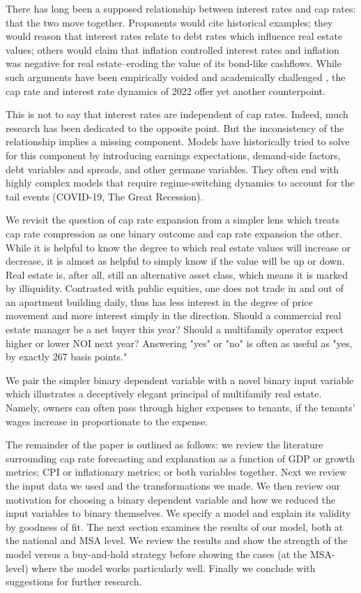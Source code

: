 There has long been a supposed relationship between interest rates and cap rates: that the two move together. Proponents would cite historical examples; they would reason that interest rates relate to debt rates which influence real estate values; others would claim that inflation controlled interest rates and inflation was negative for real estate--eroding the value of its bond-like cashflows. While  such arguments have been empirically voided and academically challenged \citep*{larriva2021determinants}, the cap rate and interest rate dynamics of 2022 offer yet another counterpoint. 

This is not to say that interest rates are independent of cap rates. Indeed, much research has been dedicated to the opposite point. But the inconsistency of the relationship implies a missing component. Models have historically tried to solve for this component by introducing earnings expectations, demand-side factors, debt variables and spreads, and other germane variables. They often end with highly complex models that require regime-switching dynamics to account for the tail events (COVID-19, The Great Recession).

We revisit the question of cap rate expansion from a simpler lens which treats cap rate compression as one binary outcome and cap rate expansion the other. While it is helpful to know the degree to which real estate values will increase or decrease, it is almost as helpful to simply know if the value will be up or down. Real estate is, after all, still an alternative asset class, which means it is marked by illiquidity. Contrasted with public equities, one does not trade in and out of an apartment building daily, thus has less interest in the degree of price movement and more interest simply in the direction. Should a commercial real estate manager be a net buyer this year? Should a multifamily operator expect higher or lower NOI next year? Answering "yes" or "no" is often as useful as "yes, by exactly 267 basis points."

We pair the simpler binary dependent variable with a novel binary input variable which illustrates a deceptively elegant principal of multifamily real estate. Namely, owners can often pass through higher expenses to tenants, if the tenants' wages increase in proportionate to the expense.

The remainder of the paper is outlined as follows: we review the literature surrounding cap rate forecasting and explanation as a function of GDP or growth metrics; CPI or inflationary metrics; or both variables together. Next we review the input data we used and the transformations we made. We then review our motivation for choosing a binary dependent variable and how we reduced the input variables to binary themselves. We specify a model and explain its validity by goodness of fit. The next section examines the results of our model, both at the national and MSA level. We review the results and show the strength of the model versus a buy-and-hold strategy before showing the cases (at the MSA-level) where the model works particularly well. Finally we conclude with suggestions for further research. 

